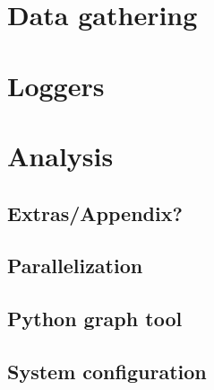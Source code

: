 \clearpage
\section{Data gathering}
	\section{Loggers}
	\section{Analysis}
\clearpage
\subsection{Extras/Appendix?}
	\subsection{Parallelization}
	\subsection{Python graph tool}
	\subsection{System configuration}
\clearpage
	